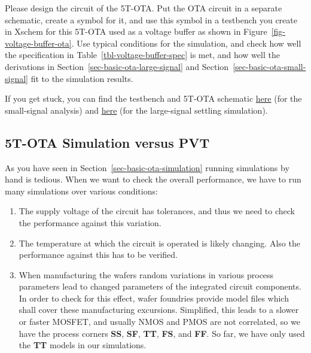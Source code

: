 \documentclass[
  a4paper,
  DIV=11,
  numbers=noendperiod]{scrartcl}
\providecommand{\tightlist}{%
  \setlength{\itemsep}{0pt}\setlength{\parskip}{0pt}}\usepackage{longtable,booktabs,array}
\begin{document}
\begin{tcolorbox}[enhanced jigsaw, titlerule=0mm, left=2mm, coltitle=black, toprule=.15mm, breakable, opacitybacktitle=0.6, colframe=quarto-callout-tip-color-frame, bottomtitle=1mm, toptitle=1mm, opacityback=0, colbacktitle=quarto-callout-tip-color!10!white, title=\textcolor{quarto-callout-tip-color}{\faLightbulb}\hspace{0.5em}{Exercise: 5T-OTA Design and Testbench}, arc=.35mm, rightrule=.15mm, colback=white, bottomrule=.15mm, leftrule=.75mm]

Please design the circuit of the 5T-OTA. Put the OTA circuit in a
separate schematic, create a symbol for it, and use this symbol in a
testbench you create in Xschem for this 5T-OTA used as a voltage buffer
as shown in Figure~\ref{fig-voltage-buffer-ota}. Use typical conditions
for the simulation, and check how well the specification in
Table~\ref{tbl-voltage-buffer-spec} is met, and how well the derivations
in Section~\ref{sec-basic-ota-large-signal} and
Section~\ref{sec-basic-ota-small-signal} fit to the simulation results.

If you get stuck, you can find the testbench and 5T-OTA schematic
\href{./xschem/ota-5t_tb-ac.svg}{here} (for the small-signal analysis)
and \href{./xschem/ota-5t_tb-ac.svg}{here} (for the large-signal
settling simulation).

\end{tcolorbox}

\subsection{5T-OTA Simulation versus
PVT}\label{t-ota-simulation-versus-pvt}

As you have seen in Section~\ref{sec-basic-ota-simulation} running
simulations by hand is tedious. When we want to check the overall
performance, we have to run many simulations over various conditions:

\begin{enumerate}
\def\labelenumi{\arabic{enumi}.}
\tightlist
\item
  The supply voltage of the circuit has tolerances, and thus we need to
  check the performance against this variation.
\item
  The temperature at which the circuit is operated is likely changing.
  Also the performance against this has to be verified.
\item
  When manufacturing the wafers random variations in various process
  parameters lead to changed parameters of the integrated circuit
  components. In order to check for this effect, wafer foundries provide
  model files which shall cover these manufacturing excursions.
  Simplified, this leads to a slower or faster MOSFET, and usually NMOS
  and PMOS are not correlated, so we have the process corners
  \textbf{SS}, \textbf{SF}, \textbf{TT}, \textbf{FS}, and \textbf{FF}.
  So far, we have only used the \textbf{TT} models in our simulations.
\end{enumerate}
\end{document}
